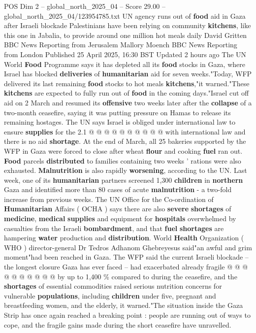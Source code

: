\begin{textsample}{POS Dim 2 – global\_north\_2025\_04 – Score 29.00 – global\_north\_2025\_04/123954785.txt}  \label{ex:f2_pos_323}
UN agency runs out of \textbf{food} aid in Gaza after Israeli blockade Palestinians have been relying on community \textbf{kitchens}, like this one in Jabalia, to provide around one million hot meals daily David Gritten BBC News Reporting from Jerusalem Mallory Moench BBC News Reporting from London Published 25 April 2025, 16:30 BST Updated 2 hours ago The UN World \textbf{Food} Programme says it has depleted all its \textbf{food} stocks in Gaza, where Israel has blocked \textbf{deliveries} of \textbf{humanitarian} aid for seven weeks."Today, WFP delivered its last remaining \textbf{food} stocks to hot meals \textbf{kitchens},"it warned."These \textbf{kitchens} are expected to fully run out of \textbf{food} in the coming days."Israel cut off aid on 2 March and resumed its \textbf{offensive} two weeks later after the \textbf{collapse} of a two-month ceasefire, saying it was putting pressure on Hamas to release its remaining hostages.
The UN says Israel is obliged under international law to ensure \textbf{supplies} for the 2.1 @ @ @ @ @ @ @ @ @ @ with international law and there is no aid \textbf{shortage}.
At the end of March, all 25 bakeries supported by the WFP in Gaza were forced to close after wheat \textbf{flour} and cooking \textbf{fuel} ran out. \textbf{Food} parcels \textbf{distributed} to families containing two weeks ' rations were also exhausted. \textbf{Malnutrition} is also rapidly \textbf{worsening}, according to the UN.
Last week, one of its \textbf{humanitarian} partners screened 1,300 \textbf{children} in \textbf{northern} Gaza and identified more than 80 cases of acute \textbf{malnutrition} - a two-fold increase from previous weeks.
The UN Office for the Co-ordination of \textbf{Humanitarian} Affairs ( OCHA ) says there are also \textbf{severe} \textbf{shortages} of \textbf{medicine}, \textbf{medical} \textbf{supplies} and equipment for \textbf{hospitals} overwhelmed by casualties from the Israeli \textbf{bombardment}, and that \textbf{fuel} \textbf{shortages} are hampering \textbf{water} production and \textbf{distribution}.
World \textbf{Health} Organization ( WHO ) director-general Dr Tedros Adhanom Ghebreyesus said"an awful and grim moment"had been reached in Gaza.
The WFP said the current Israeli blockade -- the longest closure Gaza has ever faced -- had exacerbated already fragile @ @ @ @ @ @ @ @ @ @ by up to 1,400 \% compared to during the ceasefire, and the \textbf{shortages} of essential commodities raised serious nutrition concerns for vulnerable \textbf{populations}, including \textbf{children} under five, pregnant and breastfeeding women, and the elderly, it warned."The situation inside the Gaza Strip has once again reached a breaking point : people are running out of ways to cope, and the fragile gains made during the short ceasefire have unravelled.

\end{textsample}
